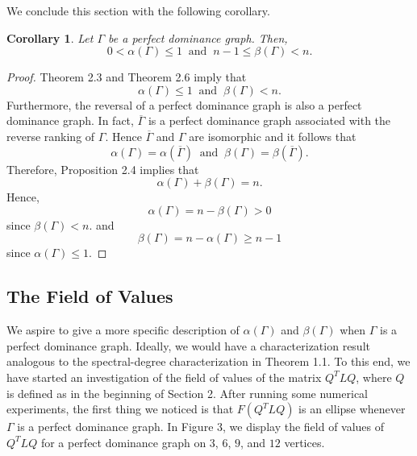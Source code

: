 \documentclass{article}
\newtheorem{corollary}[theorem]{Corollary}
\newcommand*\conj[1]{\overline{#1}}
\begin{document}
We conclude this section with the following corollary.

\begin{corollary}
Let $\Gamma$ be a perfect dominance graph.
Then,
\[
0<\alpha(\Gamma)\leq 1
~\text{ and }~
n-1\leq \beta(\Gamma) < n.
\]
\end{corollary}
\begin{proof}
Theorem 2.3 and Theorem 2.6 imply that
\[
\alpha(\Gamma)\leq 1
~\text{ and }~
\beta(\Gamma)<n.
\]
Furthermore, the reversal of a perfect dominance graph is also a perfect dominance graph.
In fact, $\conj{\Gamma}$ is a perfect dominance graph associated with the reverse ranking of $\Gamma$.
Hence $\conj{\Gamma}$ and $\Gamma$ are isomorphic and it follows that 
\[
\alpha(\Gamma)=\alpha(\conj{\Gamma})
~\text{ and }~
\beta(\Gamma)=\beta(\conj{\Gamma}).
\]
Therefore, Proposition 2.4 implies that
\[
\alpha(\Gamma)+\beta(\Gamma)=n.
\]
Hence,
\[
\alpha(\Gamma)=n-\beta(\Gamma)>0
\]
since $\beta(\Gamma)<n$. and
\[
\beta(\Gamma)=n-\alpha(\Gamma)\geq n-1
\]
since $\alpha(\Gamma)\leq 1$. 
\end{proof}

\subsection{The Field of Values}
We aspire to give a more specific description of $\alpha(\Gamma)$ and $\beta(\Gamma)$ when $\Gamma$ is a perfect dominance graph. 
Ideally, we would have a characterization result analogous to the spectral-degree characterization in Theorem 1.1. 
To this end, we have started an investigation of the field of values of the matrix $Q^{T}LQ$, where $Q$ is defined as in the beginning of Section 2.
After running some numerical experiments, the first thing we noticed is that $F(Q^{T}LQ)$ is an ellipse whenever $\Gamma$ is a perfect dominance graph.
In Figure 3, we display the field of values of $Q^{T}LQ$ for a perfect dominance graph on $3$, $6$, $9$, and $12$ vertices.
\end{document}
